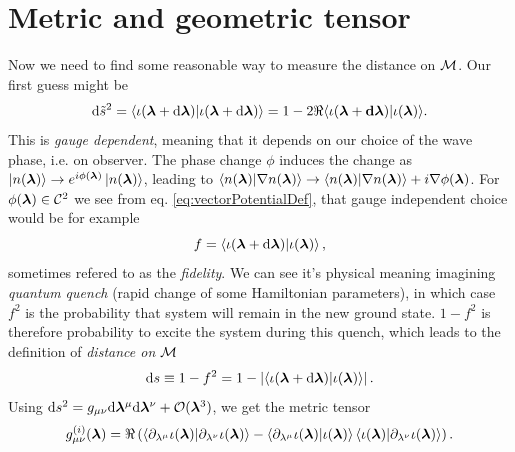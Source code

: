 \section{Metric and geometric tensor}
Now we need to find some reasonable way to measure the distance on $\mathcal{M}$. Our first guess might be
\begin{equation}
    \mathrm{d} \tilde{s}^2 = \braket{\iota(\bm{{\bm\lambda}}+\mathrm{d}\bm{{\bm\lambda}})|\iota(\bm{{\bm\lambda}}+\mathrm{d}\bm{{\bm\lambda}})} = 1-2\Re{\braket{\iota(\bm{{\bm\lambda}}+\bm{\ensuremath{\mathrm{d}}}{\bm\lambda})|\iota(\bm{{\bm\lambda}})}}.
\end{equation}
This is \emph{gauge dependent}, meaning that it depends on our choice of the wave phase, i.e. on observer. The phase change $\phi$ induces the change as $\ket{n({\bm\lambda})}\rightarrow e^{i\phi({\bm\lambda})} \ket{n({\bm\lambda})}$, leading to $\braket{n({\bm\lambda})|\nabla n({\bm\lambda})}\rightarrow \braket{n({\bm\lambda})|\nabla n({\bm\lambda})} + i\nabla \phi({\bm\lambda})$. For $\phi({\bm\lambda})\in \mathcal C^2$ we see from eq. \ref{eq:vectorPotentialDef}, that gauge independent choice would be for example 
\begin{equation}
    f=\braket{\iota(\bm{{\bm\lambda}}+\mathrm{d}\bm{{\bm\lambda}})|\iota(\bm{{\bm\lambda}})},
\end{equation}
sometimes refered to as the \emph{fidelity}. We can see it's physical meaning imagining \emph{quantum quench} (rapid change of some Hamiltonian parameters), in which case $f^2$ is the probability that system will remain in the new ground state. $1-f^2$ is therefore probability to excite the system during this quench, which leads to the definition of \emph{distance on $\mathcal{M}$}
\begin{equation}
    \mathrm{d} s \equiv 1-f^2= 1-\left|\braket{\iota(\bm{{\bm\lambda}}+\mathrm{d}\bm{{\bm\lambda}})|\iota(\bm{{\bm\lambda}})}\right|.
\end{equation}
Using $\mathrm{d} s^2 = g_{\mu\nu}\mathrm{d} {\bm\lambda}^\mu \mathrm{d}{\bm\lambda}^\nu+\mathcal{O}({\bm\lambda}^3)$, we get the metric tensor
\begin{equation}
    g_{\mu\nu}^{(i)}(\bm{{\bm\lambda}}) = \Re\left(\braket{\partial_{\lambda^\mu}\iota(\bm{{\bm\lambda}})|\partial_{\lambda^\nu}\iota(\bm{{\bm\lambda}})} - \braket{\partial_{\lambda^\mu}\iota(\bm{{\bm\lambda}})|\iota(\bm{{\bm\lambda}})}\braket{\iota(\bm{{\bm\lambda}})|\partial_{\lambda^\nu}\iota(\bm{{\bm\lambda}})}\right).
    \label{eq:geom.tensorDefinition}
\end{equation}


